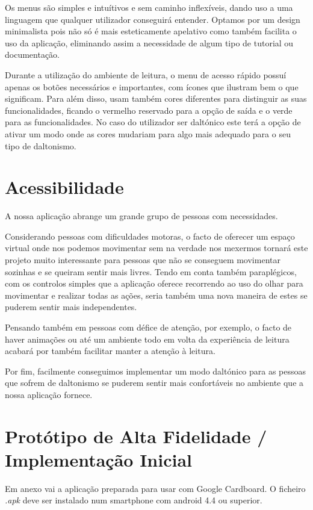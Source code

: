 \documentclass[11pt]{article}
\begin{document}
	Os menus são simples e intuítivos e sem caminho inflexíveis, dando uso a uma linguagem que qualquer utilizador conseguirá entender. Optamos por um design minimalista pois não só é mais esteticamente apelativo como também facilita o uso da aplicação, eliminando assim a necessidade de algum tipo de tutorial ou documentação.
	
	Durante a utilização do ambiente de leitura, o menu de acesso rápido possuí apenas os botões necessários e importantes, com ícones que ilustram bem o que significam. Para além disso, usam também cores diferentes para distinguir as suas funcionalidades, ficando o vermelho reservado para a opção de saída e o verde para as funcionalidades. No caso do utilizador ser daltónico este terá a opção de ativar um modo onde as cores mudariam para algo mais adequado para o seu tipo de daltonismo.
	
	
	\large
	\section{Acessibilidade}
	\normalsize
	
	A nossa aplicação abrange um grande grupo de pessoas com necessidades.
	
	Considerando pessoas com dificuldades motoras, o facto de oferecer um espaço virtual onde nos podemos movimentar sem na verdade nos mexermos tornará este projeto muito interessante para pessoas que não se conseguem movimentar sozinhas e se queiram sentir mais livres. Tendo em conta também paraplégicos, com os controlos simples que a aplicação oferece recorrendo ao uso do olhar para movimentar e realizar todas as ações, seria também uma nova maneira de estes se puderem sentir mais independentes.
	
	Pensando também em pessoas com défice de atenção, por exemplo, o facto de haver animações ou até um ambiente todo em volta da experiência de leitura acabará por também facilitar manter a atenção à leitura.
	
	Por fim, facilmente conseguimos implementar um modo daltónico para as pessoas que sofrem de daltonismo se puderem sentir mais confortáveis no ambiente que a nossa aplicação fornece.
	
	
	\large
	\section{Protótipo de Alta Fidelidade / Implementação Inicial}
	\normalsize
	
	Em anexo vai a aplicação preparada para usar com Google Cardboard. O ficheiro \textit{.apk} deve ser instalado num smartphone com android 4.4 ou superior.
	
\end{document}
